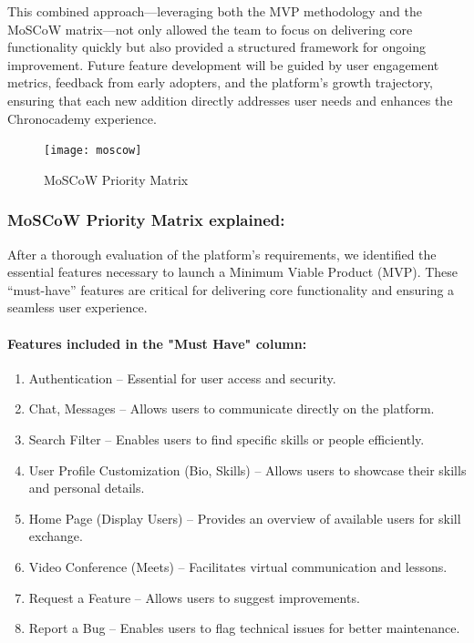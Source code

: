 This combined approach—leveraging both the MVP methodology and the MoSCoW matrix—not only allowed the team to focus on delivering core functionality quickly but also provided a structured framework for ongoing improvement.
Future feature development will be guided by user engagement metrics, feedback from early adopters, and the platform’s growth trajectory, ensuring that each new addition directly addresses user needs and enhances the Chronocademy experience.

\begin{figure}[h]
    \centering
    \texttt{[image: moscow]}
    \caption{MoSCoW Priority Matrix}
    \label{fig:figure11}
\end{figure}

\subsubsection{MoSCoW Priority Matrix explained:}
After a thorough evaluation of the platform's requirements, we identified the essential features necessary to launch a Minimum Viable Product (MVP). These ``must-have'' features are critical for delivering core functionality and ensuring a seamless user experience.

\paragraph{Features included in the "Must Have" column:}
\begin{enumerate}
    \item Authentication – Essential for user access and security.
    \item Chat, Messages – Allows users to communicate directly on the platform.
    \item Search Filter – Enables users to find specific skills or people efficiently.
    \item User Profile Customization (Bio, Skills) – Allows users to showcase their skills and personal details.
    \item Home Page (Display Users) – Provides an overview of available users for skill exchange.
    \item Video Conference (Meets) – Facilitates virtual communication and lessons.
    \item Request a Feature – Allows users to suggest improvements.
    \item Report a Bug – Enables users to flag technical issues for better maintenance.
\end{enumerate}

